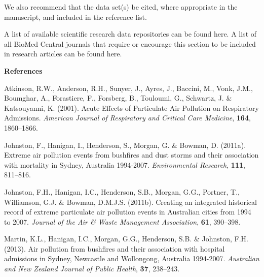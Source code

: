 We also recommend that the data set(s) be cited, where appropriate in
the manuscript, and included in the reference list.

A list of available scientific research data repositories can be found
here. A list of all BioMed Central journals that require or encourage
this section to be included in research articles can be found here.

\textbf{References}

Atkinson, R.W., Anderson, R.H., Sunyer, J., Ayres, J., Baccini, M.,
Vonk, J.M., Boumghar, A., Forastiere, F., Forsberg, B., Touloumi, G.,
Schwartz, J. \& Katsouyanni, K. (2001). Acute Effects of Particulate Air
Pollution on Respiratory Admissions. \emph{American Journal of
Respiratory and Critical Care Medicine}, \textbf{164}, 1860--1866.

Johnston, F., Hanigan, I., Henderson, S., Morgan, G. \& Bowman, D.
(2011a). Extreme air pollution events from bushfires and dust storms and
their association with mortality in Sydney, Australia 1994-2007.
\emph{Environmental Research}, \textbf{111}, 811--816.

Johnston, F.H., Hanigan, I.C., Henderson, S.B., Morgan, G.G., Portner,
T., Williamson, G.J. \& Bowman, D.M.J.S. (2011b). Creating an integrated
historical record of extreme particulate air pollution events in
Australian cities from 1994 to 2007. \emph{Journal of the Air \& Waste
Management Association}, \textbf{61}, 390--398.

Martin, K.L., Hanigan, I.C., Morgan, G.G., Henderson, S.B. \& Johnston,
F.H. (2013). Air pollution from bushfires and their association with
hospital admissions in Sydney, Newcastle and Wollongong, Australia
1994-2007. \emph{Australian and New Zealand Journal of Public Health},
\textbf{37}, 238--243.


